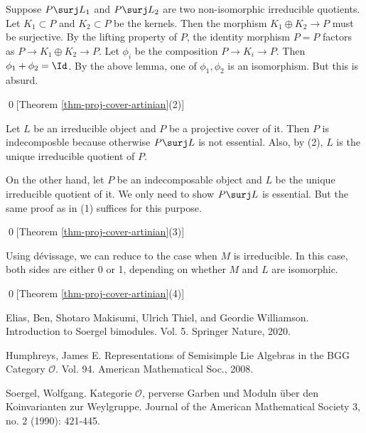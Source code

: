 
		Suppose $P\surj L_1$ and $P\surj L_2$ are two non-isomorphic irreducible quotients. Let $K_1\subset P$ and $K_2\subset P$ be the kernels. Then the morphism $K_1\oplus K_2 \to P$ must be surjective. By the lifting property of $P$, the identity morphism $P=P$ factors as $P \to K_1\oplus K_2 \to P$. Let $\phi_i$ be the composition $P \to K_i \to P$. Then $\phi_1 +\phi_2 = \Id$. By the above lemma, one of $\phi_1,\phi_2$ is an isomorphism. But this is absurd.

	\qed[Theorem \ref{thm-proj-cover-artinian}(2)]


		Let $L$ be an irreducible object and $P$ be a projective cover of it. Then $P$ is indecomposble because otherwise $P \surj L$ is not essential. Also, by (2), $L$ is the unique irreducible quotient of $P$.

		On the other hand, let $P$ be an indecomposable object and $L$ be the unique irreducible quotient of it. We only need to show $P\surj L$ is essential. But the same proof as in (1) suffices for this purpose.

	\qed[Theorem \ref{thm-proj-cover-artinian}(3)]


		Using dévissage, we can reduce to the case when $M$ is irreducible. In this case, both sides are either 0 or 1, depending on whether $M$ and $L$ are isomorphic.

	\qed[Theorem \ref{thm-proj-cover-artinian}(4)]




	

	




\begin{thebibliography}{Yau}

	 Elias, Ben, Shotaro Makisumi, Ulrich Thiel, and Geordie Williamson. Introduction to Soergel bimodules. Vol. 5. Springer Nature, 2020.

	 Humphreys, James E. Representations of Semisimple Lie Algebras in the BGG Category $\mathcal{O} $. Vol. 94. American Mathematical Soc., 2008.

	 Soergel, Wolfgang. Kategorie $\mathcal{O}$, perverse Garben und Moduln über den Koinvarianten zur Weylgruppe. Journal of the American Mathematical Society 3, no. 2 (1990): 421-445.

\end{thebibliography}


 


